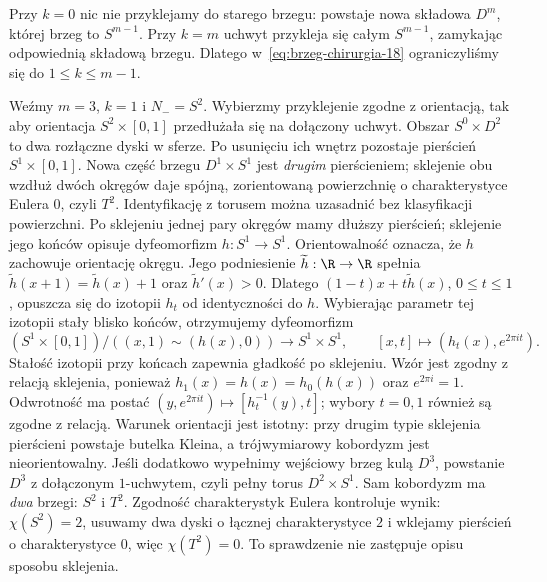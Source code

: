 \begin{uwaga}
Przy $k=0$ nic nie przyklejamy do starego
brzegu: powstaje nowa składowa $D^m$,
której brzeg to $S^{m-1}$. Przy $k=m$
uchwyt przykleja się całym $S^{m-1}$,
zamykając odpowiednią składową brzegu.
Dlatego w~\eqref{eq:brzeg-chirurgia-18}
ograniczyliśmy się do $1\leq k\leq m-1$.
\end{uwaga}

\begin{przyklad}
\label{prz:sfera-torus-chirurgia-18}
Weźmy $m=3$, $k=1$ i $N_-=S^2$.
Wybierzmy przyklejenie zgodne z orientacją,
tak aby orientacja $S^2\times[0,1]$ przedłużała się
na dołączony uchwyt.
Obszar $S^0\times D^2$ to dwa rozłączne
dyski w sferze. Po usunięciu ich wnętrz
pozostaje pierścień $S^1\times[0,1]$.
Nowa część brzegu $D^1\times S^1$
jest \emph{drugim} pierścieniem; sklejenie
obu wzdłuż dwóch okręgów daje spójną, zorientowaną
powierzchnię o charakterystyce Eulera $0$, czyli $T^2$.
Identyfikację z torusem można uzasadnić bez klasyfikacji powierzchni.
Po sklejeniu jednej pary okręgów mamy dłuższy pierścień;
sklejenie jego końców opisuje dyfeomorfizm $h:S^1\to S^1$.
Orientowalność oznacza, że $h$ zachowuje orientację okręgu.
Jego podniesienie $\widetilde h:\R\to\R$ spełnia
$\widetilde h(x+1)=\widetilde h(x)+1$ oraz $\widetilde h'(x)>0$.
Dlatego $(1-t)x+t\widetilde h(x)$, $0\leq t\leq1$,
opuszcza się do izotopii $h_t$ od identyczności do $h$.
Wybierając parametr tej izotopii stały blisko końców,
otrzymujemy dyfeomorfizm
\[
 (S^1\times[0,1])/((x,1)\sim(h(x),0))\longrightarrow S^1\times S^1,
 \qquad [x,t]\longmapsto(h_t(x),e^{2\pi it}).
\]
Stałość izotopii przy końcach zapewnia gładkość po sklejeniu.
Wzór jest zgodny z relacją sklejenia, ponieważ
$h_1(x)=h(x)=h_0(h(x))$ oraz $e^{2\pi i}=1$.
Odwrotność ma postać $(y,e^{2\pi it})\mapsto[h_t^{-1}(y),t]$;
wybory $t=0,1$ również są zgodne z relacją.
Warunek orientacji jest istotny: przy drugim typie
sklejenia pierścieni powstaje butelka Kleina,
a trójwymiarowy kobordyzm jest nieorientowalny.
Jeśli dodatkowo wypełnimy wejściowy brzeg
kulą $D^3$, powstanie $D^3$ z dołączonym
$1$-uchwytem, czyli pełny torus $D^2\times S^1$.
Sam kobordyzm ma \emph{dwa} brzegi: $S^2$ i $T^2$.
Zgodność charakterystyk Eulera kontroluje
wynik: $\chi(S^2)=2$, usuwamy dwa dyski
o łącznej charakterystyce $2$ i wklejamy
pierścień o charakterystyce $0$, więc
$\chi(T^2)=0$. To sprawdzenie nie zastępuje
opisu sposobu sklejenia.
\end{przyklad}

